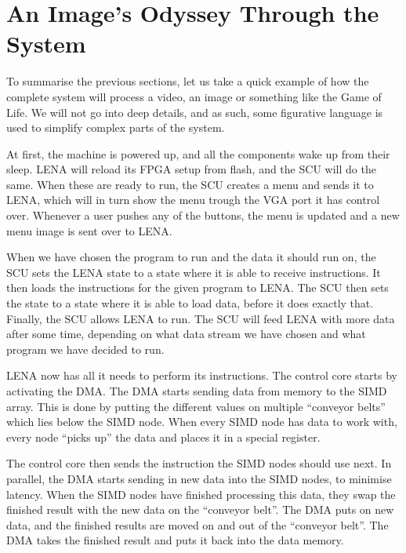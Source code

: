 \section{An Image's Odyssey Through the System}

To summarise the previous sections, let us take a quick example of how the
complete system will process a video, an image or something like the Game of
Life. We will not go into deep details, and as such, some figurative language is
used to simplify complex parts of the system.

At first, the machine is powered up, and all the components wake up from their
sleep. \ac{LENA} will reload its \ac{FPGA} setup from flash, and the \ac{SCU}
will do the same. When these are ready to run, the \ac{SCU} creates a menu and
sends it to \ac{LENA}, which will in turn show the menu trough the \ac{VGA} port
it has control over. Whenever a user pushes any of the buttons, the menu is
updated and a new menu image is sent over to \ac{LENA}.

When we have chosen the program to run and the data it should run on, the
\ac{SCU} sets the \ac{LENA} state to a state where it is able to receive
instructions. It then loads the instructions for the given program to
\ac{LENA}. The \ac{SCU} then sets the state to a state where it is able to load
data, before it does exactly that. Finally, the \ac{SCU} allows \ac{LENA} to run. The
  \ac{SCU} will feed \ac{LENA} with more data after some time, depending on what
  data stream we have chosen and what program we have decided to run.



\ac{LENA} now has all it needs to perform its instructions. The control core
starts by activating the \ac{DMA}. The \ac{DMA} starts sending data from memory
to the \ac{SIMD} array. This is done by putting the different values on multiple
``conveyor belts'' which lies below the \ac{SIMD} node. When every \ac{SIMD}
node has data to work with, every node ``picks up'' the data and places it in a
special register.

The control core then sends the instruction the \ac{SIMD} nodes should use
next. In parallel, the \ac{DMA} starts sending in new data into the \ac{SIMD}
nodes, to minimise latency. When the \ac{SIMD} nodes have finished processing
this data, they swap the finished result with the new data on the ``conveyor
belt''. The \ac{DMA} puts on new data, and the finished results are moved on and
out of the ``conveyor belt''. The \ac{DMA} takes the finished result and puts it
back into the data memory.

